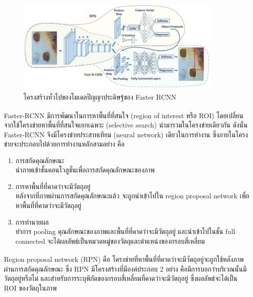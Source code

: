 \begin{figure}[!ht]
    \centering
    \includegraphics[width=0.9\textwidth]{chapter2/images/faster_rcnn.png}
    \caption[โครงสร้างทั่วไปของโมเดลปัญญาประดิษฐ์ของ Faster RCNN]{โครงสร้างทั่วไปของโมเดลปัญญาประดิษฐ์ของ Faster RCNN\textsuperscript{\cite{faster_pic}}}
    \label{fig:faster_rcnn_architecture}
\end{figure}
\par Faster-RCNN\textsuperscript{\cite{faster}} มีการพัฒนาในการหาพื้นที่ที่สนใจ (region of interest หรือ ROI) โดยเปลี่ยนจากใช้โครงข่ายหาพื้นที่ที่สนใจแยกเฉพาะ (selective search) นำมารวมในโครงข่ายเดียวกัน 
ดังนั้น Faster-RCNN จึงมีโครงข่ายประสาทเทียม (neural network) เดียวในการทำงาน ซึ่งภายในโครงข่ายจะประกอบไปด้วยการทำงานหลักสามอย่าง คือ
\begin{enumerate}
	\setlength\itemsep{-0.25em}
	\item การสกัดคุณลักษณะ
	\\	นำภาพเข้าชั้นคอนโวลูชั่นเพื่อการสกัดคุณลักษณะของภาพ
	\item การหาพื้นที่ที่คาดว่าจะมีวัตถุอยู่
	\\	หลังจากที่ภาพผ่านการสกัดคุณลักษณะแล้ว จะถูกนำเข้าไปใน region proposal network เพื่อหาพื้นที่ที่คาดว่าจะมีวัตถุอยู่
	\item การทำนายผล
	\\	ทำการ pooling คุณลักษณะของภาพและพื้นที่ที่คาดว่าจะมีวัตถุอยู่ และนำเข้าไปในชั้น full connected จะได้ผลลัพธ์เป็นหมวดหมู่ของวัตถุและตำแหน่งของกรอบสี่เหลี่ยม  
\end{enumerate}
\par Region proposal network (RPN)\textsuperscript{\cite{faster}} คือ โครงข่ายที่หาพื้นที่ที่คาดว่าจะมีวัตถุอยู่จะถูกใช้หลังภาพผ่านการสกัดคุณลักษณะ ซึ่ง RPN มีโครงสร้างที่มีองค์ประกอบ 2 อย่าง
คือมีการบอกว่าบริเวณนั้นมีวัตถุอยู่หรือไม่ และสำหรับการระบุพิกัดของกรอบสี่เหลี่ยมที่คาดว่าจะมีวัตถุอยู่ ซึ่งผลลัพธ์จะได้เป็น ROI ของวัตถุในภาพ 